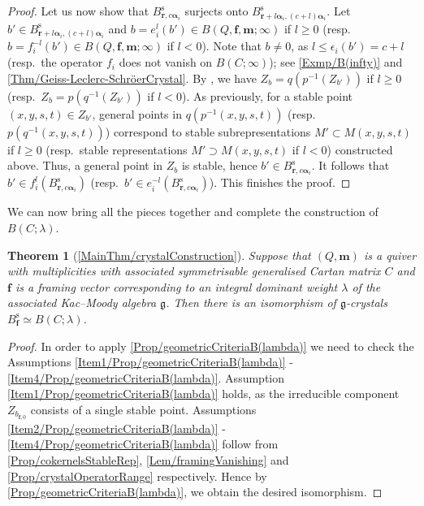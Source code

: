 \documentclass[a4paper,12pt]{article}
\theoremstyle{definition}
\theoremstyle{plain}
\newtheorem{theorem}[definition]{Theorem}
\theoremstyle{remark}
\newcommand{\st}{\mathrm{s}}
\newcommand\bfalpha{\bm{\alpha}}
\newcommand\bff{\mathbf{f}}
\newcommand\bfm{\mathbf{m}}
\newcommand\bfr{\mathbf{r}}
\begin{document}
\begin{proof}
Let us now show that $B_{\bfr,c\bfalpha_i}^\st$ surjects onto $B_{\bfr+l\bfalpha_i,(c+l)\bfalpha_i}^\st$. Let $b'\in B_{\bfr+l\bfalpha_i,(c+l)\bfalpha_i}^\st$ and $b=e_i^l(b')\in B(Q,\bff,\bfm;\infty)$ if $l\geq0$ (resp.\ $b=f_i^{-l}(b')\in B(Q,\bff,\bfm;\infty)$ if $l<0$). Note that $b\ne 0$, as $l\leq\epsilon_i(b')=c+l$ (resp.\ the operator $f_i$ does not vanish on $B(C;\infty)$); see \cref{Exmp/B(infty)} and \cref{Thm/Geiss-Leclerc-SchröerCrystal}. By \cite[Lem.\ 3.9]{GLS18a}, we have $Z_b=q(p^{-1}(Z_{b'}))$ if $l\geq0$ (resp.\  $Z_b=p(q^{-1}(Z_{b'}))$ if $l<0$). As previously, for a stable point $(x,y,s,t)\in Z_{b'}$, general points in $q(p^{-1}(x,y,s,t))$ (resp.\ $p(q^{-1}(x,y,s,t))$) correspond to stable subrepresentations $M'\subset M(x,y,s,t)$ if $l\geq0$ (resp.\ stable representations $M'\supset M(x,y,s,t)$  if $l<0$) constructed above. Thus, a general point in $Z_b$ is stable, hence $b'\in B_{\bfr,c\bfalpha_i}^\st$. It follows that $b'\in f_i^l(B_{\bfr,c\bfalpha_i}^\st)$ (resp.\ $b'\in e_i^{-l}(B_{\bfr,c\bfalpha_i}^\st)$). This finishes the proof.
\end{proof}

We can now bring all the pieces together and complete the construction of $B(C;\lambda)$.

\begin{theorem}[\cref{MainThm/crystalConstruction}]\label{Thm/geometricHWcrystal}
Suppose that $(Q,\bfm)$ is a quiver with multiplicities with associated symmetrisable generalised Cartan matrix $C$ and $\bff$ is a framing vector corresponding to an integral dominant weight $\lambda$ of the associated Kac--Moody algebra $\mathfrak{g}$. Then there is an isomorphism of $\mathfrak{g}$-crystals $B_\bff^\st\simeq B(C;\lambda)$.
\end{theorem}

\begin{proof}
In order to apply \cref{Prop/geometricCriteriaB(lambda)} we need to check the Assumptions \ref{Item1/Prop/geometricCriteriaB(lambda)} - \ref{Item4/Prop/geometricCriteriaB(lambda)}. Assumption \ref{Item1/Prop/geometricCriteriaB(lambda)} holds, as the irreducible component $Z_{b_{\bff,0}}$ consists of a single stable point. Assumptions \ref{Item2/Prop/geometricCriteriaB(lambda)} - \ref{Item4/Prop/geometricCriteriaB(lambda)} follow from \cref{Prop/cokernelsStableRep}, \cref{Lem/framingVanishing} and \cref{Prop/crystalOperatorRange} respectively. Hence by \cref{Prop/geometricCriteriaB(lambda)}, we obtain the desired isomorphism.
\end{proof}

\printbibliography[heading=subbibliography]
\end{document}
